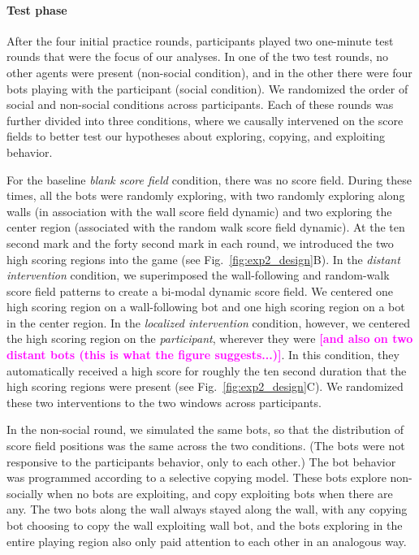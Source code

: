 \documentclass[12pt,letterpaper]{article}
\newcommand{\andrew}[1]{\textcolor{magenta}{\bf [#1]}}
\begin{document}
\paragraph{Test phase}

After the four initial practice rounds, participants played two one-minute test rounds that were the focus of our analyses. 
In one of the two test rounds, no other agents were present (non-social condition), and in the other there were four bots playing with the participant (social condition). 
We randomized the order of social and non-social conditions across participants. 
Each of these rounds was further divided into three conditions, where we causally intervened on the score fields to better test our hypotheses about exploring, copying, and exploiting behavior. 

For the baseline \textit{blank score field} condition, there was no score field. During these times, all the bots were randomly exploring, with two randomly exploring along walls (in association with the wall score field dynamic) and two exploring the center region (associated with the random walk score field dynamic). 
At the ten second mark and the forty second mark in each round, we introduced the two high scoring regions into the game (see Fig.~\ref{fig:exp2_design}B).
In the \textit{distant intervention} condition, we superimposed the wall-following and random-walk score field patterns to create a bi-modal dynamic score field. 
We centered one high scoring region on a wall-following bot and one high scoring region on a bot in the center region. 
In the \textit{localized intervention} condition, however, we centered the high scoring region on the \emph{participant}, wherever they were \andrew{and also on two distant bots (this is what the figure suggests...)}. In this condition, they automatically received a high score for roughly the ten second duration that the high scoring regions were present (see Fig.~\ref{fig:exp2_design}C).
We randomized these two interventions to the two windows across participants.

In the non-social round, we simulated the same bots, so that the distribution of score field positions was the same across the two conditions. (The bots were not responsive to the participants behavior, only to each other.) The bot behavior was programmed according to a selective copying model. These bots explore non-socially when no bots are exploiting, and copy exploiting bots when there are any. The two bots along the wall always stayed along the wall, with any copying bot choosing to copy the wall exploiting wall bot, and the bots exploring in the entire playing region also only paid attention to each other in an analogous way.
\end{document}
